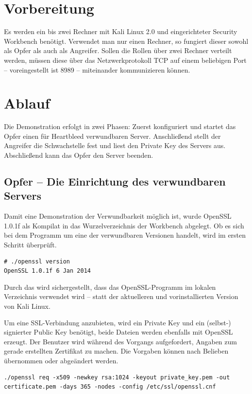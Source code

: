 \section{Vorbereitung}
Es werden ein bis zwei Rechner mit Kali Linux 2.0 und eingerichteter Security Workbench benötigt. Verwendet man nur einen Rechner, so fungiert dieser sowohl als Opfer als auch als Angreifer. Sollen die Rollen über zwei Rechner verteilt werden, müssen diese über das Netzwerkprotokoll TCP auf einem beliebigen Port -- voreingestellt ist 8989 -- miteinander kommunizieren können.

\section{Ablauf}
Die Demonstration erfolgt in zwei Phasen: Zuerst konfiguriert und startet das Opfer einen für Heartbleed verwundbaren Server. Anschließend stellt der Angreifer die Schwachstelle fest und liest den Private Key des Servers aus. Abschließend kann das Opfer den Server beenden.

\subsection{Opfer -- Die Einrichtung des verwundbaren Servers}

Damit eine Demonstration der Verwundbarkeit möglich ist, wurde OpenSSL 1.0.1f als Kompilat in das Wurzelverzeichnis der Workbench abgelegt. Ob es sich bei dem Programm um eine der verwundbaren Versionen handelt, wird im ersten Schritt überprüft.

\begin{lstlisting}
# ./openssl version
OpenSSL 1.0.1f 6 Jan 2014
\end{lstlisting}

Durch das  wird sichergestellt, dass das OpenSSL-Programm im lokalen Verzeichnis verwendet wird -- statt der aktuelleren und vorinstallierten Version von Kali Linux.

Um eine SSL-Verbindung anzubieten, wird ein Private Key und ein (selbst-) signierter Public Key benötigt, beide Dateien werden ebenfalls mit OpenSSL erzeugt. Der Benutzer wird während des Vorgangs aufgefordert, Angaben zum gerade erstellten Zertifikat zu machen. Die Vorgaben können nach Belieben übernommen oder abgeändert werden.

\begin{lstlisting}
./openssl req -x509 -newkey rsa:1024 -keyout private_key.pem -out certificate.pem -days 365 -nodes -config /etc/ssl/openssl.cnf
\end{lstlisting}

